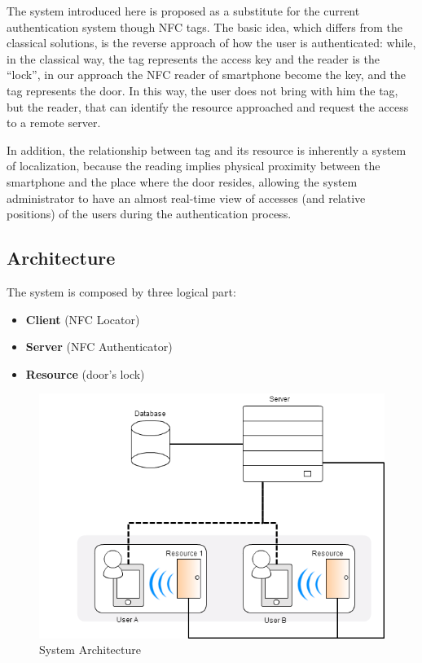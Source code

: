 \documentclass[conference]{IEEEtran}
\begin{document}
The system introduced here is proposed as a substitute for the current authentication system though NFC tags. The basic idea, which differs from the classical solutions, is the reverse approach of how the user is authenticated: while, in the classical way, the tag represents the access key and the reader is the ``lock'', in our approach the NFC reader of smartphone become the key, and the tag represents the door. In this way, the user does not bring with him the tag, but the reader, that can identify the resource approached and request the access to a remote server.

In addition, the relationship between tag and its resource is inherently a system of localization, because the reading implies physical proximity between the smartphone and the place where the door resides, allowing the system administrator to have an almost real-time view of accesses (and relative positions) of the users during the authentication process.

\subsection{Architecture}
The system is composed by three logical part:
\begin{itemize}
 \item \textbf{Client} (NFC Locator)
 \item \textbf{Server} (NFC Authenticator)
 \item \textbf{Resource} (door’s lock)
\end{itemize}

\begin{figure}[h]
\centering
\includegraphics[scale=0.4]{fig1}
\caption{System Architecture}
\label{arch}
\end{figure}
\end{document}
